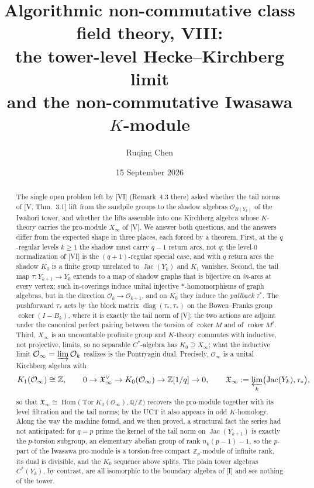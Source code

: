 \documentclass[11pt]{amsart}
\title[Algorithmic non-commutative class field theory, VIII]
{Algorithmic non-commutative class field theory, VIII:\\
the tower-level Hecke--Kirchberg limit\\ and the non-commutative Iwasawa $K$-module}
\author{Ruqing Chen}
\date{15 September 2026}
\numberwithin{equation}{section}
\theoremstyle{definition}
\theoremstyle{remark}
\newcommand{\Z}{\mathbb{Z}}
\newcommand{\Q}{\mathbb{Q}}
\newcommand{\Zp}{\Z_p}
\newcommand{\cO}{\mathcal{O}}
\newcommand{\XX}{\mathfrak{X}_\infty}
\newcommand{\Jac}{\operatorname{Jac}}
\newcommand{\coker}{\operatorname{coker}}
\newcommand{\Tor}{\operatorname{Tor}}
\newcommand{\Hom}{\operatorname{Hom}}
\newcommand{\ta}{\tau_*}
\newcommand{\taup}{\tau^*}
\begin{document}
\begin{abstract}
The single open problem left by [VI] (Remark~4.3 there) asked whether the tail norms of
[V, Thm.~3.1] lift from the sandpile groups to the shadow algebras
$\cO_{B(Y_k)}$ of the Iwahori tower, and whether the lifts assemble into one Kirchberg
algebra whose $K$-theory carries the pro-module $X_\infty$ of [V]. We answer both
questions, and the answers differ from the expected shape in three places, each forced
by a theorem. First, at the $q$-regular levels $k\ge1$ the shadow must carry $q-1$
return arcs, not $q$: the level-$0$ normalization of [VI] is the $(q{+}1)$-regular
special case, and with $q$ return arcs the shadow $K_0$ is a finite group unrelated to
$\Jac(Y_k)$ and $K_1$ vanishes. Second, the tail map $\tau\colon Y_{k+1}\to Y_k$ extends
to a map of shadow graphs that is bijective on \emph{in}-arcs at every vertex; such
in-coverings induce unital injective $*$-homomorphisms of graph algebras, but in the
direction $\cO_k\to\cO_{k+1}$, and on $K_0$ they induce the \emph{pullback} $\taup$. The
pushforward $\ta$ acts by the block matrix $\operatorname{diag}(\ta,\ta)$ on the
Bowen--Franks group $\coker(I-B_k)$, where it is exactly the tail norm of [V]; the two
actions are adjoint under the canonical perfect pairing between the torsion of
$\coker M$ and of $\coker M^{t}$. Third, $X_\infty$ is an uncountable profinite group
and $K$-theory commutes with inductive, not projective, limits, so no separable
$C^*$-algebra has $K_0\supseteq X_\infty$; what the inductive limit
$\cO_\infty=\varinjlim\cO_k$ realizes is the Pontryagin dual. Precisely, $\cO_\infty$ is
a unital Kirchberg algebra with
\[
K_1(\cO_\infty)\cong\Z,\qquad
0\to\XX^{\vee}\to K_0(\cO_\infty)\to\Z[1/q]\to0,\qquad
\XX:=\varprojlim_k\bigl(\Jac(Y_k),\ta\bigr),
\]
so that $\XX\cong\Hom\bigl(\Tor K_0(\cO_\infty),\Q/\Z\bigr)$ recovers the pro-module
together with its level filtration and the tail norms; by the UCT it also appears in
odd $K$-homology. Along the way the machine found, and we then proved, a structural
fact the series had not anticipated: for $q=p$ prime the kernel of the tail norm on
$\Jac(Y_{k+1})$ is exactly the $p$-torsion subgroup, an elementary abelian group of rank
$n_k(p-1)-1$, so the $p$-part of the Iwasawa pro-module is a torsion-free compact
$\Zp$-module of infinite rank, its dual is divisible, and the $K_0$ sequence above
splits. The plain tower algebras $C^*(Y_k)$, by contrast, are all isomorphic to the
boundary algebra of [I] and see nothing of the tower.
\end{abstract}
\end{document}
